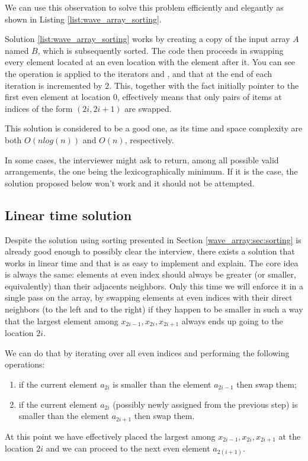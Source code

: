 We can use this observation to solve this problem efficiently and elegantly as shown in  Listing \ref{list:wave_array_sorting}.



Solution \ref{list:wave_array_sorting} works by creating a copy of the input array $A$ named $B$, which is subsequently sorted. The code then proceeds in swapping every element located at an even location with the element after it. 
You can see the  operation is applied to the iterators  and , and that at the end of each iteration  is incremented by $2$.
This, together with the fact  initially pointer to the first even element at location $0$, effectively means that only pairs of items at indices of the form $(2i, 2i+1)$ are swapped.

This solution is considered to be a good one, as its time and space complexity are both $O(nlog(n))$
and $O(n)$, respectively.

In some cases, the interviewer might ask to return, among all possible valid arrangements, the one being the lexicographically minimum. If it is the case, the solution proposed below won't work and it should not be attempted.


\subsection{Linear time solution}

Despite the solution using sorting presented in Section \ref{wave_array:sec:sorting} is already good enough to
possibly clear the interview, there exists a solution that works in linear time and that is as easy to
implement and explain. The core idea is always the same: elements at even index should always be
greater (or smaller, equivalently) than their adjacents neighbors. Only this time we will enforce it in a single pass on the array, by
swapping elements at even indices with their direct neighbors (to the left and to the right) if they happen to be smaller in such a way that the largest element among  $x_{2i-1},x_{2i},x_{2i+1}$ always ends up going to the location $2i$.

We can do that by iterating over all even indices and performing the following operations:
\begin{enumerate}
	\item if the current element $a_{2i}$ is smaller than the element $a_{2i-1}$ then swap them; 
	\item if the current element $a_{2i}$ (possibly newly assigned from the previous step) is smaller than the element $a_{2i+1}$ then swap them.
\end{enumerate}
At this point we have effectively placed the largest among $x_{2i-1},x_{2i},x_{2i+1}$ at the location $2i$ and we can proceed to the next even element $a_{2(i+1)}$. 

